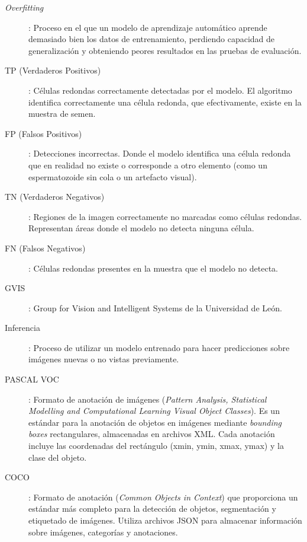 \documentclass[12pt,a4paper,onecolumn,oneside]{report}
\begin{document}
\begin{description}
  \item[\textit{Overfitting}]: Proceso en el que un modelo de aprendizaje automático aprende demasiado bien los datos de entrenamiento, perdiendo capacidad de generalización y obteniendo peores resultados en las pruebas de evaluación.
  \item[TP (Verdaderos Positivos)]: Células redondas correctamente detectadas por el modelo. El algoritmo identifica correctamente una célula redonda, que efectivamente, existe en la muestra de semen.
  \item[FP (Falsos Positivos)]: Detecciones incorrectas. Donde el modelo identifica una célula redonda que en realidad no existe o corresponde a otro elemento (como un espermatozoide sin cola o un artefacto visual).
  \item[TN (Verdaderos Negativos)]: Regiones de la imagen correctamente no marcadas como células redondas. Representan áreas donde el modelo no detecta ninguna célula.
  \item[FN (Falsos Negativos)]: Células redondas presentes en la muestra que el modelo no detecta.
  \item[GVIS]:  Group for Vision and Intelligent Systems de la Universidad de León.  
  \item[Inferencia]: Proceso de utilizar un modelo entrenado para hacer predicciones sobre imágenes nuevas o no vistas previamente.
  \item[PASCAL VOC]: Formato de anotación de imágenes (\textit{Pattern Analysis, Statistical Modelling and Computational Learning Visual Object Classes}). 
  Es un estándar para la anotación de objetos en imágenes mediante \textit{bounding boxes} rectangulares, almacenadas en archivos XML. Cada anotación incluye las coordenadas del 
  rectángulo (xmin, ymin, xmax, ymax) y la clase del objeto.
  \item[COCO]: Formato de anotación (\textit{Common Objects in Context}) que proporciona un estándar más completo para la detección de objetos, segmentación y etiquetado de imágenes. Utiliza archivos JSON para 
  almacenar información sobre imágenes, categorías y anotaciones.
\end{description} 

\newpage
\renewcommand{\thepage}{\arabic{page}}
\setcounter{page}{1} %
\end{document}
